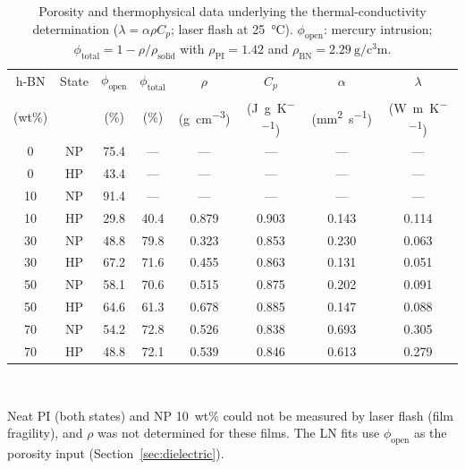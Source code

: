 \documentclass[preprint,a4paper]{elsarticle}
\newcommand{\lam}{\ensuremath{\lambda}}
\begin{document}
\begin{table}[htbp]
\centering
\caption{Porosity and thermophysical data underlying the thermal-conductivity determination ($\lam = \alpha\rho C_p$; laser flash at \SI{25}{\celsius}). $\phi_{\mathrm{open}}$: mercury intrusion; $\phi_{\mathrm{total}} = 1-\rho/\rho_{\mathrm{solid}}$ with $\rho_{\mathrm{PI}} = 1.42$ and $\rho_{\mathrm{BN}} = \SI{2.29}{\gram\per\cubic\centi\meter}$.}
\label{tab:thermo}
\footnotesize
\begin{tabular}{@{}cccccccc@{}}
\toprule
h-BN & State & $\phi_{\mathrm{open}}$ & $\phi_{\mathrm{total}}$ & $\rho$ & $C_p$ & $\alpha$ & \lam \\
(wt\%) & & (\%) & (\%) & (\si{\gram\per\cubic\centi\meter}) & (\si{\joule\per\gram\per\kelvin}) & (\si{\milli\meter\squared\per\second}) & (\si{\watt\per\meter\per\kelvin}) \\
\midrule
0  & NP & 75.4 & ---  & ---   & ---   & ---   & --- \\
0  & HP & 43.4 & ---  & ---   & ---   & ---   & --- \\
10 & NP & 91.4 & ---  & ---   & ---   & ---   & --- \\
10 & HP & 29.8 & 40.4 & 0.879 & 0.903 & 0.143 & 0.114 \\
30 & NP & 48.8 & 79.8 & 0.323 & 0.853 & 0.230 & 0.063 \\
30 & HP & 67.2 & 71.6 & 0.455 & 0.863 & 0.131 & 0.051 \\
50 & NP & 58.1 & 70.6 & 0.515 & 0.875 & 0.202 & 0.091 \\
50 & HP & 64.6 & 61.3 & 0.678 & 0.885 & 0.147 & 0.088 \\
70 & NP & 54.2 & 72.8 & 0.526 & 0.838 & 0.693 & 0.305 \\
70 & HP & 48.8 & 72.1 & 0.539 & 0.846 & 0.613 & 0.279 \\
\bottomrule
\end{tabular}\\[3pt]
\parbox{0.95\linewidth}{\footnotesize Neat PI (both states) and NP 10~wt\% could not be measured by laser flash (film fragility), and $\rho$ was not determined for these films. The LN fits use $\phi_{\mathrm{open}}$ as the porosity input (Section~\ref{sec:dielectric}).}
\end{table}
\end{document}
